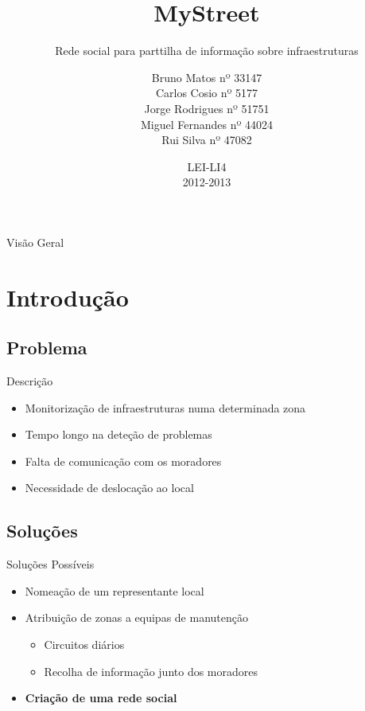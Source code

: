 \documentclass[portuges]{beamer}
\title
{MyStreet}
\subtitle
{Rede social para parttilha de informação sobre infraestruturas}
\author[Li4]
{
Bruno Matos nº 33147\\ 
Carlos Cosio nº 5177\\
Jorge Rodrigues nº 51751\\
Miguel Fernandes nº 44024\\ 
Rui Silva nº 47082\\
}
\date %
{
LEI-LI4       \\
2012-2013
}
\begin{document}
\begin{frame}
  \titlepage
\end{frame}

\begin{frame}{Visão Geral}
  \tableofcontents
\end{frame}




\section{Introdução}

\subsection{Problema}

\begin{frame}{Descrição}
  \begin{itemize}
  \item Monitorização de infraestruturas numa determinada zona
  \item Tempo longo na deteção de problemas
  \item Falta de comunicação com os moradores
  \item Necessidade de deslocação ao local
  \end{itemize}
\end{frame}

\subsection{Soluções}

\begin{frame}{Soluções Possíveis}
  \begin{itemize}
  \item Nomeação de um representante local
  \item Atribuição de zonas a equipas de manutenção
    \begin{itemize}
    \item Circuitos diários
    \item Recolha de informação junto dos moradores
    \end{itemize}
  \item \textbf{Criação de uma rede social}
  \end{itemize}
\end{frame}
\end{document}
